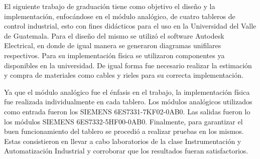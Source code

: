 El siguiente trabajo de graduación tiene como objetivo el diseño y la implementación, enfocándose en el módulo analógico, de cuatro tableros de control industrial, esto con fines didácticos para el uso en la Universidad del Valle de Guatemala. Para el diseño del mismo se utilizó el software Autodesk Electrical, en donde de igual manera se generaron diagramas unifilares respectivos. Para su implementación física se utilizaron componentes ya disponibles en la universidad. De igual forma fue necesario realizar la estimación y compra de materiales como cables y rieles para su correcta implementación.

Ya que el módulo analógico fue el énfasis en el trabajo, la implementación física fue realizada individualmente en cada tablero. Los módulos analógicos utilizados como entrada fueron los SIEMENS 6ES7331-7KF02-0AB0. Las salidas fueron lo los módulos SIEMENS 6ES7332-5HF00-0AB0. Finalmente, para garantizar el buen funcionamiento del tablero se procedió a realizar pruebas en los mismos. Estas consistieron en llevar a cabo laboratorios de la clase Instrumentación y Automatización Industrial y corroborar que los resultados fueran satisfactorios.